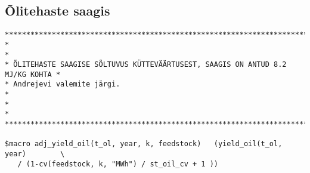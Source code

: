 \subsection{Õlitehaste saagis}
\begin{verbatim}
********************************************************************************
*                                                                              *
* ÕLITEHASTE SAAGISE SÕLTUVUS KÜTTEVÄÄRTUSEST, SAAGIS ON ANTUD 8.2 MJ/KG KOHTA *
* Andrejevi valemite järgi.                                                    *
*                                                                              *
********************************************************************************

$macro adj_yield_oil(t_ol, year, k, feedstock)   (yield_oil(t_ol, year)        \
   / (1-cv(feedstock, k, "MWh") / st_oil_cv + 1 ))
\end{verbatim}

